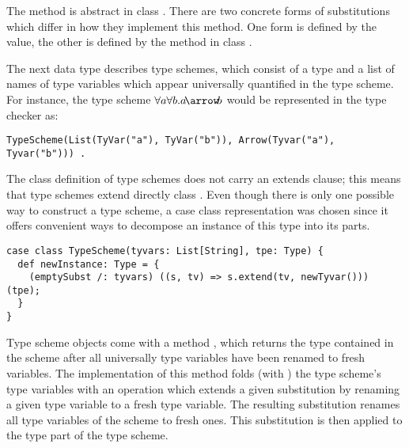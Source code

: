 {The  method is abstract in class .  There are
two concrete forms of substitutions which differ in how they
implement this method.  One form is defined by the  value,
the other is defined by the  method in class
.

The next data type describes type schemes, which consist of a type and
a list of names of type variables which appear universally quantified
in the type scheme. 
For instance, the type scheme $\forall a\forall b.a \!\arrow\! b$ would be represented in the type checker as:
\begin{lstlisting}
TypeScheme(List(TyVar("a"), TyVar("b")), Arrow(Tyvar("a"), Tyvar("b"))) .
\end{lstlisting}
The class definition of type schemes does not carry an extends
clause; this means that type schemes extend directly class
.  Even though there is only one possible way to
construct a type scheme, a case class representation was chosen
since it offers convenient ways to decompose an instance of this type into its
parts.
\begin{lstlisting}
case class TypeScheme(tyvars: List[String], tpe: Type) {
  def newInstance: Type = {
    (emptySubst /: tyvars) ((s, tv) => s.extend(tv, newTyvar())) (tpe);
  }
}
\end{lstlisting}
Type scheme objects come with a method , which
returns the type contained in the scheme after all universally type
variables have been renamed to fresh variables. The implementation of
this method folds (with \code{/:}) the type scheme's type variables
with an operation which extends a given substitution  by
renaming a given type variable  to a fresh type
variable. The resulting substitution renames all type variables of the
scheme to fresh ones. This substitution is then applied to the type
part of the type scheme.

}
